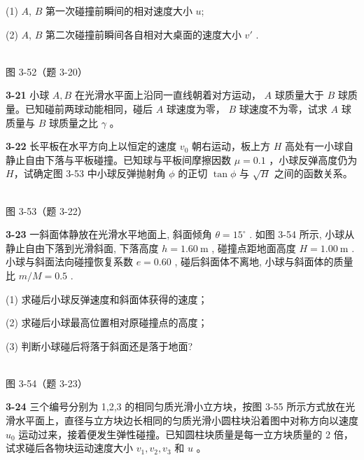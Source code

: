 (1) $A$, $B$ 第一次碰撞前瞬间的相对速度大小 $u$;

(2) $A$, $B$ 第二次碰撞前瞬间各自相对大桌面的速度大小 $v'$ .

\begin{center}
\resizebox{0.35\textwidth}{!}{}\\[4pt]
{\small 图 3-52（题 3-20）}
\end{center}

\newpage

\textbf{3-21} 小球 $A, B$ 在光滑水平面上沿同一直线朝着对方运动， $A$ 球质量大于 $B$ 球质量。已知碰前两球动能相同，碰后 $A$ 球速度为零， $B$ 球速度不为零，试求 $A$ 球质量与 $B$ 球质量之比 $\gamma$ 。

\newpage

\textbf{3-22} 长平板在水平方向上以恒定的速度 $v_{0}$ 朝右运动，板上方 $H$ 高处有一小球自静止自由下落与平板碰撞。已知球与平板间摩擦因数 $\mu=0.1$ ，小球反弹高度仍为 $H$，试确定图 3-53 中小球反弹抛射角 $\phi$ 的正切 $\tan\phi$ 与 $\sqrt{H}$ 之间的函数关系。

\begin{center}
\resizebox{0.50\textwidth}{!}{}\\[4pt]
{\small 图 3-53（题 3-22）}
\end{center}

\newpage

\textbf{3-23} 一斜面体静放在光滑水平地面上, 斜面倾角 $\theta = 15^{\circ}$ . 如图 3-54 所示, 小球从静止自由下落到光滑斜面, 下落高度 $h = 1.60 \mathrm{~m}$ , 碰撞点距地面高度 $H = 1.00 \mathrm{~m}$ . 小球与斜面法向碰撞恢复系数 $e = 0.60$ , 碰后斜面体不离地, 小球与斜面体的质量比 $m / M = 0.5$ .

(1) 求碰后小球反弹速度和斜面体获得的速度；

(2) 求碰后小球最高位置相对原碰撞点的高度；

(3) 判断小球碰后将落于斜面还是落于地面?

\begin{center}
\resizebox{0.47\textwidth}{!}{}\\[4pt]
{\small 图 3-54（题 3-23）}
\end{center}

\newpage

\textbf{3-24} 三个编号分别为 1,2,3 的相同匀质光滑小立方块，按图 3-55 所示方式放在光滑水平面上，直径与立方块边长相同的匀质光滑小圆柱块沿着图中对称方向以速度 $u_0$ 运动过来，接着便发生弹性碰撞。已知圆柱块质量是每一立方块质量的 2 倍，试求碰后各物块运动速度大小 $v_1, v_2, v_3$ 和 $u$ 。

